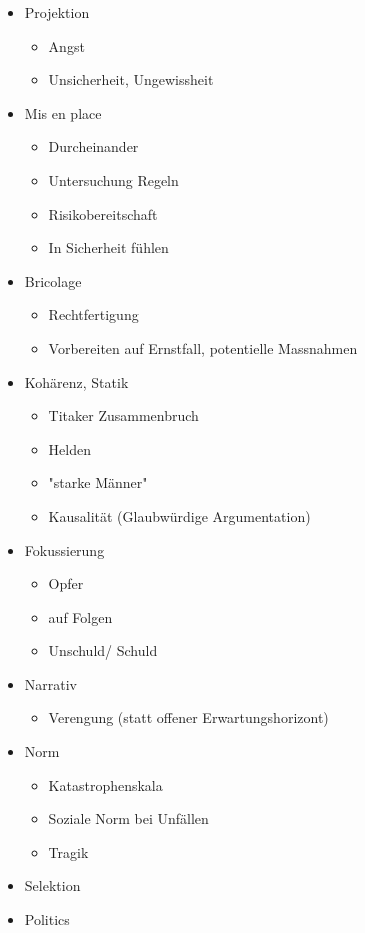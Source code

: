 \documentclass[a4paper,ngerman,11pt]{scrartcl}
\begin{document}
\begin{itemize}
\item Projektion

\begin{itemize}
\item Angst
\item Unsicherheit, Ungewissheit
\end{itemize}

\item Mis en place

\begin{itemize}
\item Durcheinander
\item Untersuchung Regeln
\item Risikobereitschaft
\item In Sicherheit fühlen
\end{itemize}

\item Bricolage

\begin{itemize}
\item Rechtfertigung
\item Vorbereiten auf Ernstfall, potentielle Massnahmen
\end{itemize}

\item Kohärenz, Statik

\begin{itemize}
\item Titaker Zusammenbruch
\item Helden
\item "starke Männer"
\item Kausalität (Glaubwürdige Argumentation)
\end{itemize}

\item Fokussierung

\begin{itemize}
\item Opfer
\item auf Folgen
\item Unschuld/ Schuld
\end{itemize}

\item Narrativ

\begin{itemize}
\item Verengung (statt offener Erwartungshorizont)
\end{itemize}

\item Norm

\begin{itemize}
\item Katastrophenskala
\item Soziale Norm bei Unfällen
\item Tragik
\end{itemize}

\item Selektion

\item Politics
\end{itemize}
\end{document}
